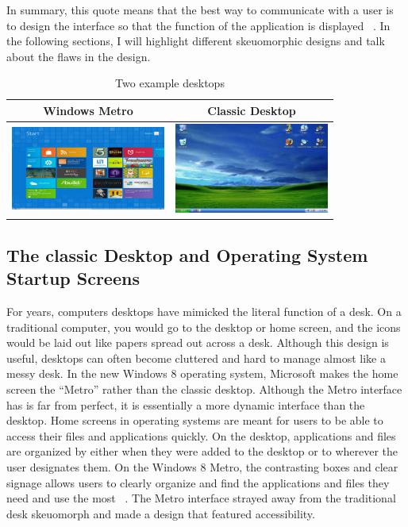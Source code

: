 \documentclass{article}
\begin{document}
In summary, this quote means that the best way to communicate with a user is to design the interface so that the function of the application is displayed ~\cite{Gizmodo}. In the following sections, I will highlight different skeuomorphic designs and talk about the flaws in the design.

\begin{table}
\centering
\begin{tabular}{|c|c|}\hline
Windows Metro & Classic Desktop \\\hline\hline
\includegraphics[width = 2in]{metro.jpeg} & \includegraphics[width = 2in]{pc-desktop.jpeg} \\\hline
\end{tabular}

\caption{Two example desktops}
\label{desktops}
\end{table}

\subsection{The classic Desktop and Operating System Startup Screens}
	For years, computers desktops have mimicked the literal function of a desk. On a traditional computer, you would go to the desktop or home screen, and the icons would be laid out like papers spread out across a desk. Although this design is useful, desktops can often become cluttered and hard to manage almost like a messy desk. In the new Windows 8 operating system, Microsoft makes the home screen the “Metro” rather than the classic desktop. Although the Metro interface has is far from perfect, it is essentially a more dynamic interface than the desktop. Home screens in operating systems are meant for users to be able to access their files and applications quickly. On the desktop, applications and files are organized by either when they were added to the desktop or to wherever the user designates them. On the Windows 8 Metro, the contrasting boxes and clear signage allows users to clearly organize and find the applications and files they need and use the most ~\cite{Hobbs}. The Metro interface strayed away from the traditional desk skeuomorph and made a design that featured accessibility. 
\end{document}
